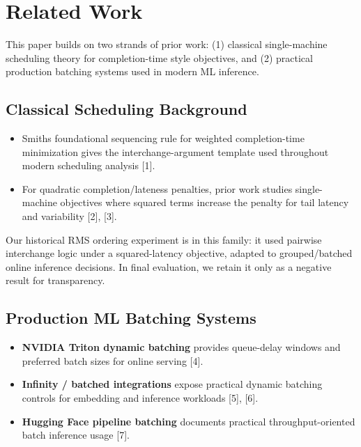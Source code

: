 \documentclass{article}
\providecommand{\tightlist}{\setlength{\itemsep}{0pt}\setlength{\parskip}{0pt}}
\begin{document}
\hypertarget{2-related-work}{%
\section{Related Work}\label{2-related-work}}

This paper builds on two strands of prior work: (1) classical
single-machine scheduling theory for completion-time style objectives,
and (2) practical production batching systems used in modern ML
inference.

\hypertarget{21-classical-scheduling-background}{%
\subsection{Classical Scheduling
Background}\label{21-classical-scheduling-background}}

\begin{itemize}
\tightlist
\item
  Smith\textquotesingle s foundational sequencing rule for weighted
  completion-time minimization gives the interchange-argument template
  used throughout modern scheduling analysis {[}1{]}.
\item
  For quadratic completion/lateness penalties, prior work studies
  single-machine objectives where squared terms increase the penalty for
  tail latency and variability {[}2{]}, {[}3{]}.
\end{itemize}

Our historical RMS ordering experiment is in this family: it used
pairwise interchange logic under a squared-latency objective, adapted to
grouped/batched online inference decisions. In final evaluation, we
retain it only as a negative result for transparency.

\hypertarget{22-production-ml-batching-systems}{%
\subsection{Production ML Batching
Systems}\label{22-production-ml-batching-systems}}

\begin{itemize}
\tightlist
\item
  \textbf{NVIDIA Triton dynamic batching} provides queue-delay windows
  and preferred batch sizes for online serving {[}4{]}.
\item
  \textbf{Infinity / batched integrations} expose practical dynamic
  batching controls for embedding and inference workloads {[}5{]},
  {[}6{]}.
\item
  \textbf{Hugging Face pipeline batching} documents practical
  throughput-oriented batch inference usage {[}7{]}.
\end{itemize}
\end{document}
